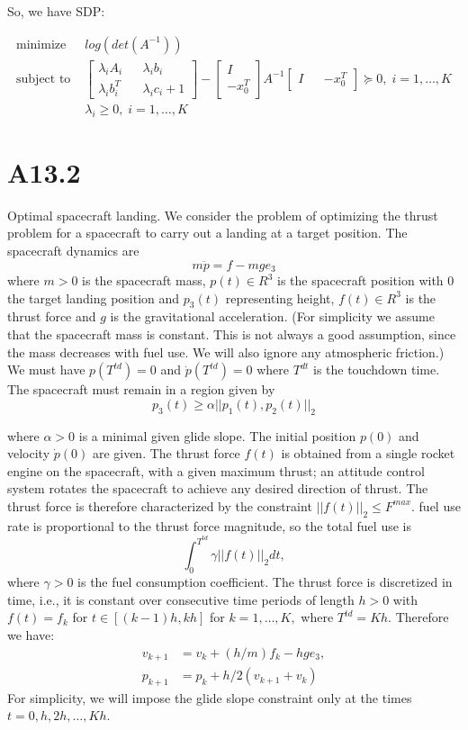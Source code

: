 \documentclass{article}
\begin{document}
So, we have SDP:

\begin{align*}
	\text{minimize } &log(det(A^{-1})) \\
	\text{subject to } &
	\begin{bmatrix}
		\lambda_i A_i&& \lambda_i b_i\\
		\lambda_i b_i^T && \lambda_i c_i + 1
	\end{bmatrix} - 
	\begin{bmatrix}
		I\\
		-x_0^T
	\end{bmatrix} A^{-1} 
	\begin{bmatrix}
		I &&
		-x_0^T
	\end{bmatrix}
	\succeq 0, \; i = 1, \dots, K\\
	& \lambda_i \geq 0, \; i = 1, \dots, K	
\end{align*} 

\section*{A13.2} %

Optimal spacecraft landing. We consider the problem of optimizing the thrust problem for a spacecraft
to carry out a landing at a target position. The spacecraft dynamics are
$$
m\ddot{p} = f - mge_3
$$
where $m > 0$ is the spacecraft mass, $p(t) \in R^3$ is the spacecraft position with 0 the target landing position and $p_3(t)$ representing height, 
$f(t) \in R^3$ is the thrust force and $g$ is the gravitational acceleration. (For simplicity we assume that the spacecraft mass is constant. This is not always
a good assumption, since the mass decreases with fuel use. We will also ignore any atmospheric
friction.) We must have $p(T^{td}) = 0$ and 
$\dot{p}(T^{td}) = 0$ where $T^{dt}$ is the touchdown time. The spacecraft must remain in a region given by
$$
p_3(t) \geq \alpha ||p_1(t), p_2(t)||_2
$$

where $\alpha > 0$ is a minimal given glide slope. The initial position $p(0)$ and velocity $\dot{p}(0)$ are given. The thrust force $f(t)$ is obtained from a single rocket engine on the spacecraft, with a given
maximum thrust; an attitude control system rotates the spacecraft to achieve any desired direction
of thrust. The thrust force is therefore characterized by the constraint $||f(t)||_2 \leq F^{max}.$ fuel
use rate is proportional to the thrust force magnitude, so the total fuel use is
$$
\int_{0}^{T^{td}} \gamma ||f(t)||_2 dt,
$$
where $\gamma > 0$ is the fuel consumption coefficient. The thrust force is discretized in time, i.e., it is
constant over consecutive time periods of length $h > 0$
with $f(t) = f_k$ for $t \in [(k - 1)h, kh]$ for 
$k = 1, \dots, K,$ where $T^{td} = Kh.$ Therefore we have:
\begin{align*}
v_{k + 1} &= v_{k} + (h / m) f_k- hge_3, \\
p_{k + 1} &= p_k + h / 2 (v_{k + 1} + v_k)
\end{align*} 
For simplicity, we will impose the glide slope constraint only at the times $t = 0, h, 2h, \dots, Kh.$\\
\end{document}

